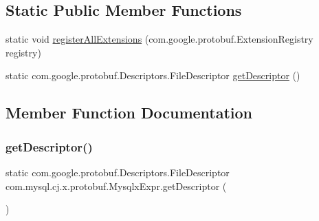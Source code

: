 \subsection*{Static Public Member Functions}
\begin{DoxyCompactItemize}
\item 
static void \mbox{\hyperlink{classcom_1_1mysql_1_1cj_1_1x_1_1protobuf_1_1_mysqlx_expr_ad93727516f637efec3e4d96ff8ef5850}{register\+All\+Extensions}} (com.\+google.\+protobuf.\+Extension\+Registry registry)
\item 
static com.\+google.\+protobuf.\+Descriptors.\+File\+Descriptor \mbox{\hyperlink{classcom_1_1mysql_1_1cj_1_1x_1_1protobuf_1_1_mysqlx_expr_a75a79493b90171a6edd11b4aac33848d}{get\+Descriptor}} ()
\end{DoxyCompactItemize}


\subsection{Member Function Documentation}
\mbox{\label{classcom_1_1mysql_1_1cj_1_1x_1_1protobuf_1_1_mysqlx_expr_a75a79493b90171a6edd11b4aac33848d}} 
\subsubsection{\texorpdfstring{get\+Descriptor()}{getDescriptor()}}
{\footnotesize\ttfamily static com.\+google.\+protobuf.\+Descriptors.\+File\+Descriptor com.\+mysql.\+cj.\+x.\+protobuf.\+Mysqlx\+Expr.\+get\+Descriptor (\begin{DoxyParamCaption}{ }\end{DoxyParamCaption})\hspace{0.3cm}{\ttfamily [static]}}

\mbox{\label{classcom_1_1mysql_1_1cj_1_1x_1_1protobuf_1_1_mysqlx_expr_ad93727516f637efec3e4d96ff8ef5850}} 
